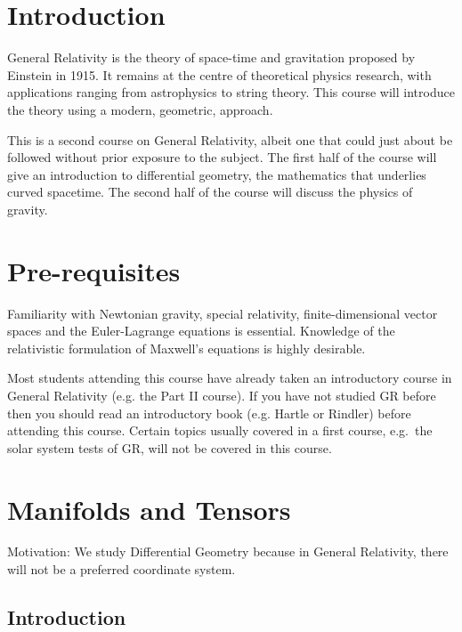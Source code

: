 \documentclass[a4paper,11pt]{article}
\begin{document}
	\maketitlepage

	\preliminaries

	\section*{Introduction}

	\noindent General Relativity is the theory of space-time and gravitation proposed by Einstein in 1915. It remains at the centre of theoretical physics research, with applications ranging from astrophysics to string theory. This course will introduce the theory using a modern, geometric, approach.
	
	\noindent This is a second course on General Relativity, albeit one that could just about be followed without prior exposure to the subject. The first half of the course will give an introduction to differential geometry, the mathematics that underlies curved spacetime. The second half of the course will discuss the physics of gravity.

	\section*{Pre-requisites}
	
	\noindent Familiarity with Newtonian gravity, special relativity, finite-dimensional vector spaces and the Euler-Lagrange equations is essential. Knowledge of the relativistic formulation of Maxwell’s equations is highly desirable.
	
	\noindent Most students attending this course have already taken an introductory course in General Relativity (e.g. the Part II course). If you have not studied GR before then you should read an introductory book (e.g. Hartle or Rindler) before attending this course. Certain topics usually covered in a first course, e.g.\ the solar system tests of GR, will not be covered in this course.

	\newpage
	\tableofcontents
	\newpage
	\maintext
	
	\section{Manifolds and Tensors}
	Motivation: We study Differential Geometry because in General Relativity, there will not be a preferred coordinate system.

	\subsection{Introduction}
\end{document}
